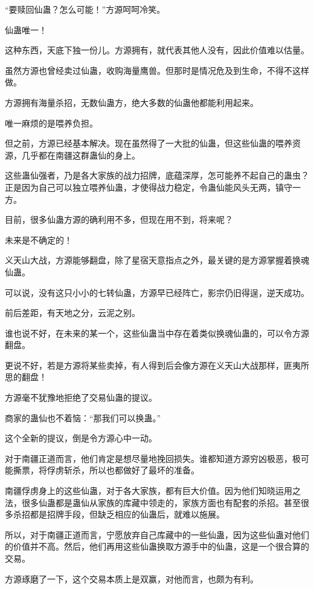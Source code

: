 
\begin{this_body}

“要赎回仙蛊？怎么可能！”方源呵呵冷笑。

仙蛊唯一！

这种东西，天底下独一份儿。方源拥有，就代表其他人没有，因此价值难以估量。

虽然方源也曾经卖过仙蛊，收购海量鹰兽。但那时是情况危及到生命，不得不这样做。

方源拥有海量杀招，无数仙蛊方，绝大多数的仙蛊他都能利用起来。

唯一麻烦的是喂养负担。

但之前，方源已经基本解决。现在虽然得了一大批的仙蛊，但这些仙蛊的喂养资源，几乎都在南疆这群蛊仙的身上。

这些蛊仙强者，乃是各大家族的战力招牌，底蕴深厚，怎可能养不起自己的蛊虫？正是因为自己可以独立喂养仙蛊，才使得战力稳定，令蛊仙能风头无两，镇守一方。

目前，很多仙蛊方源的确利用不多，但现在用不到，将来呢？

未来是不确定的！

义天山大战，方源能够翻盘，除了星宿天意指点之外，最关键的是方源掌握着换魂仙蛊。

可以说，没有这只小小的七转仙蛊，方源早已经阵亡，影宗仍旧得逞，逆天成功。

前后差距，有天地之分，云泥之别。

谁也说不好，在未来的某一个，这些仙蛊当中存在着类似换魂仙蛊的，可以令方源翻盘。

更说不好，若是方源将某些卖掉，有人得到后会像方源在义天山大战那样，匪夷所思的翻盘！

方源毫不犹豫地拒绝了交易仙蛊的提议。

商家的蛊仙也不着恼：“那我们可以换蛊。”

这个全新的提议，倒是令方源心中一动。

对于南疆正道而言，他们肯定是想尽量地挽回损失。谁都知道方源穷凶极恶，极可能撕票，将俘虏斩杀，所以也都做好了最坏的准备。

南疆俘虏身上的这些仙蛊，对于各大家族，都有巨大价值。因为他们知晓运用之法，很多仙蛊都是蛊仙从家族的库藏中领走的，家族方面也有配套的杀招。甚至很多杀招都是招牌手段，但缺乏相应的仙蛊后，就难以施展。

所以，对于南疆正道而言，宁愿放弃自己库藏中的一些仙蛊，因为这些仙蛊对他们的价值并不高。然后，他们再用这些仙蛊换取方源手中的仙蛊，这是一个很合算的交易。

方源琢磨了一下，这个交易本质上是双赢，对他而言，也颇为有利。


\end{this_body}
